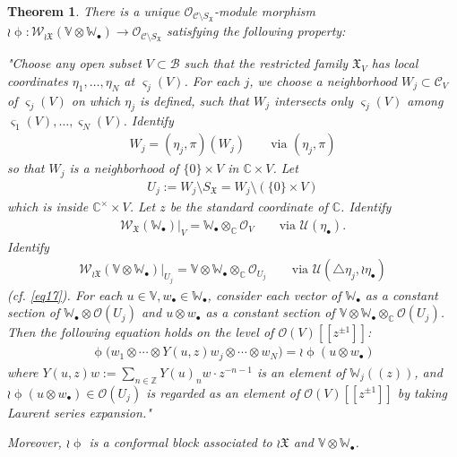 \documentclass[12pt,a4paper,notitlepage]{article}
\theoremstyle{definition}
\theoremstyle{plain}
\newtheorem{thm}[df]{Theorem}
\newcommand{\fk}{\mathfrak}
\newcommand{\mc}{\mathcal}
\newcommand{\scr}{\mathscr}
\newcommand{\sgm}{\varsigma}
\newcommand{\SX}{{S_{\fk X}}}
\newcommand{\blt}{\bullet}
\newcommand{\Vbb}{\mathbb V}
\newcommand{\Wbb}{\mathbb W}
\newcommand{\Cbb}{\mathbb C}
\newcommand{\Zbb}{\mathbb Z}
\numberwithin{equation}{section}
\begin{document}
\begin{thm}\label{lb4}
There is a unique $\scr O_{\mc C\setminus\SX}$-module morphism $\wr\upphi:\scr W_{\wr\fk X}(\Vbb\otimes\Wbb_\blt)\rightarrow\scr O_{\mc C\setminus\SX}$ satisfying the  following property: 

"Choose any open subset $V\subset\mc B$  such that the restricted family $\fk X_V$ has local coordinates $\eta_1,\dots,\eta_N$ at $\sgm_j(V)$. For each $j$, we choose a neighborhood $W_j\subset\mc C_V$ of $\sgm_j(V)$ on which $\eta_j$ is defined, such that $W_j$ intersects only $\sgm_j(V)$ among $\sgm_1(V),\dots,\sgm_N(V)$. Identify 
\begin{align*}
W_j=(\eta_j,\pi)(W_j)	\qquad\text{via }(\eta_j,\pi)
\end{align*}
so that $W_j$ is a neighborhood of $\{0\}\times V$ in $\Cbb\times V$. Let
\begin{align*}
U_j:=W_j\setminus\SX=W_j\setminus(\{0\}\times V)	
\end{align*}
which is inside $\Cbb^\times\times V$. Let $z$ be the standard coordinate of $\Cbb$. Identify
\begin{align*}
\scr W_{\fk X}(\Wbb_\blt)\big|_V=\Wbb_\blt\otimes_\Cbb\scr O_V	\qquad\text{via }\mc U(\eta_\blt).
\end{align*}
Identify 
\begin{align}
\scr W_{\wr\fk X}(\Vbb\otimes\Wbb_\blt)\big|_{U_j}=\Vbb\otimes\Wbb_\blt\otimes_\Cbb\scr O_{U_j}\qquad\text{via }\mc U(\triangle\eta_j,\wr\eta_\blt)\label{eq25}	
\end{align}
(cf. \eqref{eq17}). For each $u\in\Vbb,w_\blt\in\Wbb_\blt$, consider each vector of $\Wbb_\blt$ as a constant section of $\Wbb_\blt\otimes\scr O(U_j)$ and  $u\otimes w_\blt$ as a constant section of $\Vbb\otimes\Wbb_\blt\otimes_\Cbb\scr O(U_j)$. Then the following equation holds on the level of $\scr O(V)[[z^{\pm 1}]]$:
\begin{align}
\boxed{~\upphi\big(w_1\otimes\cdots\otimes Y(u,z)w_j\otimes\cdots\otimes w_N\big)=\wr\upphi(u\otimes w_\blt)~}\label{eq18}
\end{align}
where $Y(u,z)w:=\sum_{n\in\Zbb}Y(u)_nw\cdot z^{-n-1}$  is an element of $\Wbb_j((z))$, and  $\wr\upphi(u\otimes w_\blt)\in \scr O(U_j)$ is regarded as an element of $\scr O(V)[[z^{\pm 1}]]$ by taking Laurent series expansion."

Moreover, $\wr\upphi$ is a conformal block associated to $\wr\fk X$ and $\Vbb\otimes\Wbb_\blt$.
\end{thm}
\end{document}

